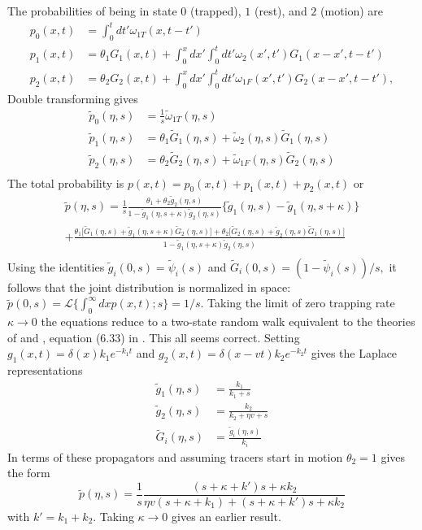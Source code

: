 \documentclass[]{agujournal2018}
\newcommand\be{\begin{equation}}
\newcommand\ee{\end{equation}}
\newcommand\tom{\tilde{\omega}}
\newcommand\tg{\tilde{g}}
\newcommand\tp{\tilde{p}}
\newcommand\tG{\tilde{G}}
\begin{document}
The probabilities of being in state $0$ (trapped), $1$ (rest), and $2$ (motion) are
\begin{align}
p_0(x,t) &= \int_0^t dt' \omega_{1T}(x,t-t')\\
p_1(x,t) &= \theta_1 G_1(x,t) + \int_0^x dx' \int_0^t dt' \omega_2(x',t')G_1(x-x',t-t')\\
p_2(x,t) &= \theta_2 G_2(x,t) + \int_0^x dx' \int_0^t dt' \omega_{1F}(x',t')G_2(x-x',t-t'),
\end{align}
Double transforming gives
\begin{align}
\tp_0(\eta,s) &= \frac{1}{s}\tom_{1T}(\eta,s)\\
\tp_1(\eta,s) &= \theta_1 \tG_1(\eta,s) + \tom_2(\eta,s) \tG_1(\eta,s) \\
\tp_2(\eta,s) &= \theta_2 \tG_2(\eta,s) + \tom_{1F}(\eta,s)\tG_2(\eta,s)\\
\end{align}
The total probability is $p(x,t) = p_0(x,t) + p_1(x,t) + p_2(x,t)$ or 
\begin{multline}
\tp(\eta,s) = \frac{1}{s}\frac{\theta_1 + \theta_2 \tg_2(\eta,s)}{1-\tg_1(\eta,s+\kappa)\tg_2(\eta,s)}\big\{\tg_1(\eta,s)-\tg_1(\eta,s+\kappa) \big\} \\
+\frac{\theta_1\big[\tG_1(\eta,s) + \tg_1(\eta,s+\kappa)\tG_2(\eta,s)\big]+ \theta_2\big[\tG_2(\eta,s) + \tg_2(\eta,s)\tG_1(\eta,s)\big]}{1-\tg_1(\eta,s+\kappa)\tg_2(\eta,s)} \\
\end{multline}
Using the identities $\tg_i(0,s) = \tilde{\psi}_i(s)$ and $\tG_i(0,s) = (1-\tilde{\psi}_i(s))/s,$ it follows that the joint distribution is normalized in space: $\tp(0,s) = \mathcal{L}\{\int_0^\infty dx p(x,t);s\} = 1/s$.
Taking the limit of zero trapping rate $\kappa \rightarrow 0$ the equations reduce to a two-state random walk equivalent to the theories of \citet{Einstein1937} and \citet{Lisle1998}, equation (6.33) in \citet{Weiss1994}. This all seems correct.
Setting $g_1(x,t) = \delta(x)k_1e^{-k_1t}$ and $g_2(x,t) = \delta(x-vt)k_2e^{-k_2 t}$ gives the Laplace representations
\begin{align}
\tg_1(\eta,s) &= \frac{k_1}{k_1 + s}\\
\tg_2(\eta,s) &=  \frac{k_2}{k_2 + \eta v + s} \\
\tG_i(\eta,s) &= \frac{\tg_i(\eta,s)}{k_i}
\end{align}
In terms of these propagators and assuming tracers start in motion $\theta_2 =1$ gives the form
\be \tp(\eta,s) =\frac{1}{s} \frac{(s+\kappa+k')s + \kappa k_2}{\eta v(s + \kappa + k_1) + (s+ \kappa + k')s + \kappa k_2} \ee
with $k' = k_1 + k_2$. Taking $\kappa \rightarrow 0$ gives an earlier result.
\end{document}
